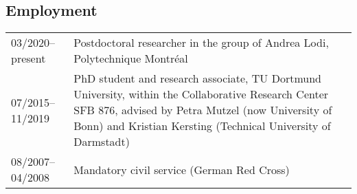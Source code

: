 \documentclass[11pt, a4paper, DIV=12]{scrartcl}
\begin{document}
\subsection*{Employment}
\begin{tabular}{p{3.0cm}p{11.5cm}}
	03/2020--present& Postdoctoral researcher in the group of Andrea Lodi, Polytechnique Montréal\\
	07/2015--11/2019&PhD student and research associate, TU Dortmund University, within the Collaborative Research Center SFB 876, advised by Petra Mutzel (now University of Bonn) and Kristian Kersting (Technical University of Darmstadt)\\
	08/2007--04/2008&Mandatory civil service (German Red Cross)\\
\end{tabular}

\renewcommand{\refname}{\large\bfseries Publications}
\end{document}
